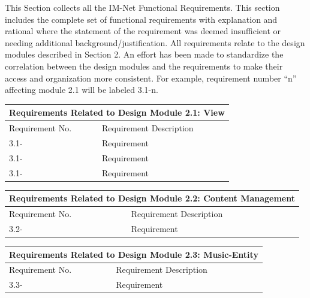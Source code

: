 \documentclass[letterpaper,12pt]{article}
\newcounter{rcounter}						%
\newcommand\rnumber{\stepcounter{rcounter}\arabic{rcounter}}
\begin{document}
{This Section collects all the IM-Net Functional Requirements. This section includes the complete set of functional requirements with explanation and rational where the statement of the requirement was deemed insufficient or needing additional background/justification. All requirements relate to the design modules described in Section 2. An effort has been made to standardize the correlation between the design modules and the requirements to make their access and organization more consistent. For example, requirement number ``n'' affecting module 2.1 will be labeled 3.1-n.

\setcounter{rcounter}{0}
\begin{center}
\begin{tabular}{|p{3.5cm}|l|}
\hline 
\multicolumn{2}{|c|}{\textbf{Requirements Related to Design Module 2.1: View}} \\ 
\hline 
Requirement No. & Requirement Description \\ 
\hline
3.1-\rnumber & Requirement \\ 
\hline 
3.1-\rnumber & Requirement \\ 
\hline 
3.1-\rnumber & Requirement \\ 
\hline 
\end{tabular} 
\end{center}

\setcounter{rcounter}{0}
\begin{center}
\begin{tabular}{|p{3.5cm}|l|}
\hline 
\multicolumn{2}{|c|}{\textbf{Requirements Related to Design Module 2.2: Content Management}} \\ 
\hline 
Requirement No. & Requirement Description \\ 
\hline
3.2-\rnumber & Requirement \\ 
\hline 
\end{tabular} 
\end{center}

\setcounter{rcounter}{0}
\begin{center}
\begin{tabular}{|p{3.5cm}|l|}
\hline 
\multicolumn{2}{|c|}{\textbf{Requirements Related to Design Module 2.3: Music-Entity}} \\ 
\hline 
Requirement No. & Requirement Description \\ 
\hline
3.3-\rnumber & Requirement \\ 
\hline 
\end{tabular} 
\end{center}

}
\end{document}
